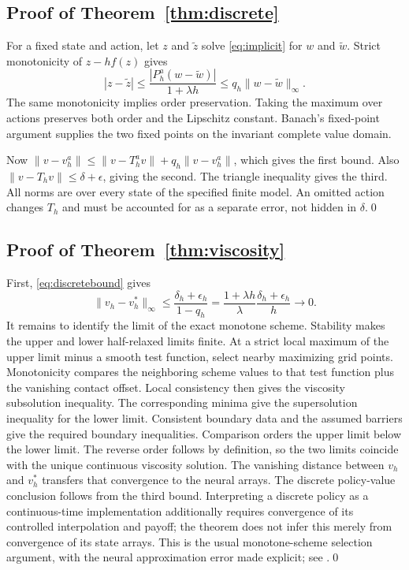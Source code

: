 \begin{appendix}
\subsection{Proof of Theorem~\ref{thm:discrete}}
For a fixed state and action, let $z$ and $\tilde z$ solve \eqref{eq:implicit} for $w$ and $\tilde w$. Strict monotonicity of $z-hf(z)$ gives
\[
 |z-\tilde z|\leq\frac{|P_h^a(w-\tilde w)|}{1+\lambda h}
 \leq q_h\|w-\tilde w\|_\infty.
\]
The same monotonicity implies order preservation. Taking the maximum over actions preserves both order and the Lipschitz constant. Banach's fixed-point argument supplies the two fixed points on the invariant complete value domain.

Now $\|v-v_h^a\|\leq\|v-T_h^av\|+q_h\|v-v_h^a\|$, which gives the first bound. Also $\|v-T_hv\|\leq\delta+\epsilon$, giving the second. The triangle inequality gives the third. All norms are over every state of the specified finite model. An omitted action changes $T_h$ and must be accounted for as a separate error, not hidden in $\delta$.\qed

\subsection{Proof of Theorem~\ref{thm:viscosity}}
First, \eqref{eq:discretebound} gives
\[
 \|v_h-v_h^*\|_\infty\leq\frac{\delta_h+\epsilon_h}{1-q_h}
 =\frac{1+\lambda h}{\lambda}\frac{\delta_h+\epsilon_h}{h}\longrightarrow0.
\]
It remains to identify the limit of the exact monotone scheme. Stability makes the upper and lower half-relaxed limits finite. At a strict local maximum of the upper limit minus a smooth test function, select nearby maximizing grid points. Monotonicity compares the neighboring scheme values to that test function plus the vanishing contact offset. Local consistency then gives the viscosity subsolution inequality. The corresponding minima give the supersolution inequality for the lower limit. Consistent boundary data and the assumed barriers give the required boundary inequalities. Comparison orders the upper limit below the lower limit. The reverse order follows by definition, so the two limits coincide with the unique continuous viscosity solution. The vanishing distance between $v_h$ and $v_h^*$ transfers that convergence to the neural arrays. The discrete policy-value conclusion follows from the third bound. Interpreting a discrete policy as a continuous-time implementation additionally requires convergence of its controlled interpolation and payoff; the theorem does not infer this merely from convergence of its state arrays. This is the usual monotone-scheme selection argument, with the neural approximation error made explicit; see \citet{barles1991,crandall1992}.\qed


\end{appendix}
